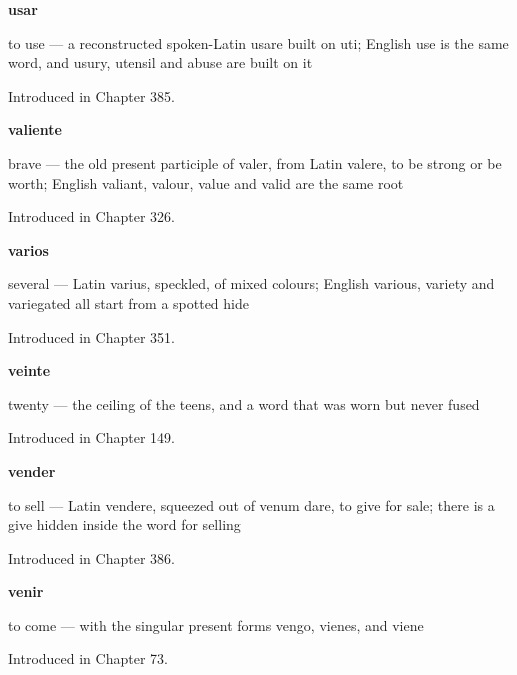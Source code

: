 \noindent\begin{minipage}[t]{\linewidth}
\raggedright
\textbf{usar}\par
\small to use — a reconstructed spoken-Latin usare built on uti; English use is the same word, and usury, utensil and abuse are built on it\par
\footnotesize Introduced in Chapter 385.
\end{minipage}\par\medskip

\noindent\begin{minipage}[t]{\linewidth}
\raggedright
\textbf{valiente}\par
\small brave — the old present participle of valer, from Latin valere, to be strong or be worth; English valiant, valour, value and valid are the same root\par
\footnotesize Introduced in Chapter 326.
\end{minipage}\par\medskip

\noindent\begin{minipage}[t]{\linewidth}
\raggedright
\textbf{varios}\par
\small several — Latin varius, speckled, of mixed colours; English various, variety and variegated all start from a spotted hide\par
\footnotesize Introduced in Chapter 351.
\end{minipage}\par\medskip

\noindent\begin{minipage}[t]{\linewidth}
\raggedright
\textbf{veinte}\par
\small twenty — the ceiling of the teens, and a word that was worn but never fused\par
\footnotesize Introduced in Chapter 149.
\end{minipage}\par\medskip

\noindent\begin{minipage}[t]{\linewidth}
\raggedright
\textbf{vender}\par
\small to sell — Latin vendere, squeezed out of venum dare, to give for sale; there is a give hidden inside the word for selling\par
\footnotesize Introduced in Chapter 386.
\end{minipage}\par\medskip

\noindent\begin{minipage}[t]{\linewidth}
\raggedright
\textbf{venir}\par
\small to come — with the singular present forms vengo, vienes, and viene\par
\footnotesize Introduced in Chapter 73.
\end{minipage}\par\medskip


